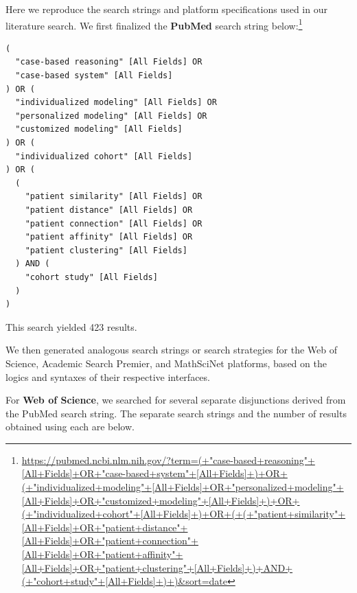 \documentclass{article}
\begin{document}
Here we reproduce the search strings and platform specifications used in
our literature search. We first finalized the \textbf{PubMed} search
string below:\footnote{\url{https://pubmed.ncbi.nlm.nih.gov/?term=(+"case-based+reasoning"+[All+Fields]+OR+"case-based+system"+[All+Fields]+)+OR+(+"individualized+modeling"+[All+Fields]+OR+"personalized+modeling"+[All+Fields]+OR+"customized+modeling"+[All+Fields]+)+OR+(+"individualized+cohort"+[All+Fields]+)+OR+(+(+"patient+similarity"+[All+Fields]+OR+"patient+distance"+[All+Fields]+OR+"patient+connection"+[All+Fields]+OR+"patient+affinity"+[All+Fields]+OR+"patient+clustering"+[All+Fields]+)+AND+(+"cohort+study"+[All+Fields]+)+)&sort=date}}

\begin{verbatim}
(
  "case-based reasoning" [All Fields] OR
  "case-based system" [All Fields]
) OR (
  "individualized modeling" [All Fields] OR
  "personalized modeling" [All Fields] OR
  "customized modeling" [All Fields]
) OR (
  "individualized cohort" [All Fields]
) OR (
  (
    "patient similarity" [All Fields] OR
    "patient distance" [All Fields] OR
    "patient connection" [All Fields] OR
    "patient affinity" [All Fields] OR
    "patient clustering" [All Fields]
  ) AND (
    "cohort study" [All Fields]
  )
)
\end{verbatim}

This search yielded 423 results.

We then generated analogous search strings or search strategies for the
Web of Science, Academic Search Premier, and MathSciNet platforms, based
on the logics and syntaxes of their respective interfaces.

For \textbf{Web of Science}, we searched for several separate
disjunctions derived from the PubMed search string. The separate search
strings and the number of results obtained using each are below.
\end{document}
